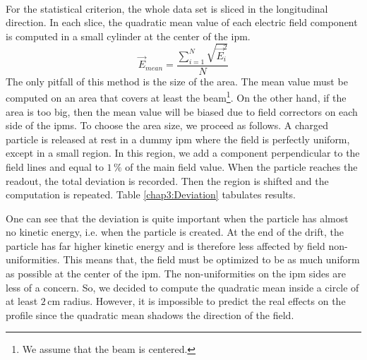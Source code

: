 \begin{refsection}
  \paragraph{}
  For the statistical criterion, the whole data set is sliced in the longitudinal direction. In each slice, the quadratic mean value of each electric field component is computed in a small cylinder at the center of the \acrshort{ipm}.
  \begin{equation}
    \vec{E}_{mean} = \frac{\sum_{i=1}^{N}\sqrt{\vec{E}_{i}^{2}}}{N}
  \end{equation}
  The only pitfall of this method is the size of the area. The mean value must be computed on an area that covers at least the beam\footnote{We assume that the beam is centered.}. On the other hand, if the area is too big, then the mean value will be biased due to field correctors on each side of the \acrshort{ipm}s.
  To choose the area size, we proceed as follows. A charged particle is released at rest in a dummy \acrshort{ipm} where the field is perfectly uniform, except in a small region. In this region, we add a component perpendicular to the field lines and equal to $1\,\mathrm{\%}$ of the main field value. When the particle reaches the readout, the total deviation is recorded. Then the region is shifted and the computation is repeated. Table \ref{chap3:Deviation} tabulates results.

  

  One can see that the deviation is quite important when the particle has almost no kinetic energy, i.e. when the particle is created.
  At the end of the drift, the particle has far higher kinetic energy and is therefore less affected by field non-uniformities. This means that, the field must be optimized to be as much uniform as possible at the center of the \acrshort{ipm}. The non-uniformities on the \acrshort{ipm} sides are less of a concern.
  So, we decided to compute the quadratic mean inside a circle of at least $2\,\mathrm{cm}$ radius. However, it is impossible to predict the real effects on the profile since the quadratic mean shadows the direction of the field.


\end{refsection}
